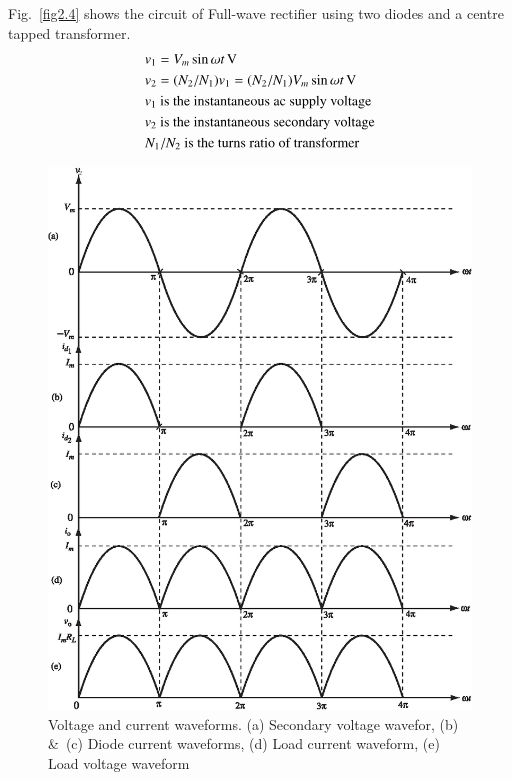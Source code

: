 Fig.~\ref{fig2.4} shows the circuit of Full-wave rectifier using two diodes and
a centre tapped transformer.
\begin{align*}
& v_1  = V_m \sin \omega t \operatorname{\mathrm{V}}\\
& v_2  = (N_2 / N_1) v_1 = (N_2 /N_1) V_m \sin \omega t \operatorname{\mathrm{V}}\\
& v_1 \text{ is the instantaneous ac supply voltage}\\
& v_2 \text{ is the instantaneous secondary voltage}\\
& N_1/N_2 \text{ is the turns ratio of transformer}
\end{align*}
\begin{figure}[H]
\centering
\includegraphics{chap2/add-fig/S3-EE-02-005.eps}
\caption{Voltage and current waveforms. (a) Secondary voltage wavefor, (b) \&\ (c) Diode current waveforms, (d) Load current waveform, (e) Load voltage waveform}\label{fig2.5}
\end{figure}

\eject

